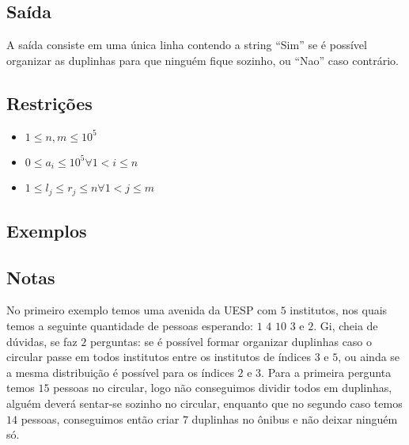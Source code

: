 \subsection*{Saída}

A saída consiste em uma única linha contendo a string ``Sim'' se é possível organizar as duplinhas para que ninguém fique sozinho, ou ``Nao'' caso contrário.


\subsection*{Restrições}
\begin{itemize}
	\item $1 \leq n, m \leq 10^5$
	\item $0 \leq a_i \leq 10^5 \forall 1 < i \leq n$
	\item $1 \leq l_j \leq r_j \leq n \forall 1 < j \leq m$
\end{itemize}

\subsection*{Exemplos}


\subsection*{Notas}
No primeiro exemplo temos uma avenida da UESP com $5$ institutos, nos quais temos a seguinte quantidade de pessoas esperando: $1$ $4$ $10$ $3$ e $2$. Gi, cheia de dúvidas, se faz $2$ perguntas: se é possível formar organizar duplinhas caso o circular passe em todos institutos entre os institutos de índices $3$ e $5$, ou ainda se a mesma distribuição é possível para os índices $2$ e $3$. Para a primeira pergunta temos $15$ pessoas no circular, logo não conseguimos dividir todos em duplinhas, alguém deverá sentar-se sozinho no circular, enquanto que no segundo caso temos $14$ pessoas, conseguimos então criar $7$ duplinhas no ônibus e não deixar ninguém só.
